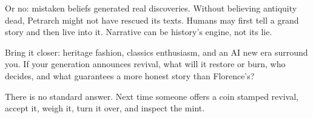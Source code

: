 Or no: mistaken beliefs generated real discoveries. Without believing antiquity dead, Petrarch might not have rescued its texts. Humans may first tell a grand story and then live into it. Narrative can be history's engine, not its lie.

Bring it closer: heritage fashion, classics enthusiasm, and an AI new era surround you. If your generation announces revival, what will it restore or burn, who decides, and what guarantees a more honest story than Florence's?

There is no standard answer. Next time someone offers a coin stamped revival, accept it, weigh it, turn it over, and inspect the mint.
